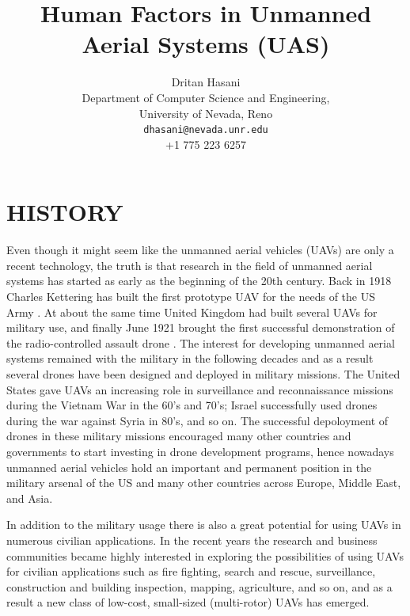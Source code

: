 \documentclass[12pt, letterpaper, oneside]{article}
\title{\textbf{Human Factors in Unmanned Aerial Systems (UAS)}}
\author{Dritan Hasani\\
		Department of Computer Science and Engineering,\\
		University of Nevada, Reno\\
		\texttt{dhasani@nevada.unr.edu}\\
		{+1 775 223 6257}}
\date{}
\begin{document}
 
\begin{titlepage}
\maketitle
\thispagestyle{empty}
\end{titlepage}
 
\section{HISTORY}
Even though it might seem like the unmanned aerial vehicles (UAVs) are only a recent technology, the truth is that research in the field of unmanned aerial systems has started as early as the beginning of the 20th century. Back in 1918 Charles Kettering has built the first prototype UAV for the needs of the US Army \cite{10}. At about the same time United Kingdom had built several UAVs for military use, and finally June 1921 brought the first successful demonstration of the radio-controlled assault drone \cite{16}. The interest for developing unmanned aerial systems remained with the military in the following decades and as a result several drones have been designed and deployed in military missions. The United States gave UAVs an increasing role in surveillance and reconnaissance missions during the Vietnam War in the 60's and 70's; Israel successfully used drones during the war against Syria in 80's, and so on. The successful depoloyment of drones in these military missions encouraged many other countries and governments to start investing in drone development programs, hence nowadays unmanned aerial vehicles hold an important and permanent position in the military arsenal of the US and many other countries across Europe, Middle East, and Asia.
  
In addition to the military usage there is also a great potential for using UAVs in numerous civilian applications. In the recent years the research and business communities became highly interested in exploring the possibilities of using UAVs for civilian applications such as fire fighting, search and rescue, surveillance, construction and building inspection, mapping, agriculture, and so on, and as a result a new class of low-cost, small-sized (multi-rotor) UAVs has emerged.
\end{document}
